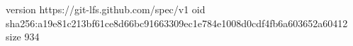 version https://git-lfs.github.com/spec/v1
oid sha256:a19e81c213bf61ce8d66bc91663309ec1e784e1008d0cdf4fb6a603652a60412
size 934
